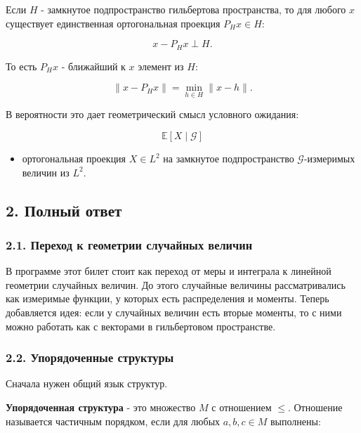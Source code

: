 \documentclass[
  11pt,
  a4paper,
]{article}
\providecommand{\tightlist}{%
  \setlength{\itemsep}{0pt}\setlength{\parskip}{0pt}}
\begin{document}
Если \(H\) - замкнутое подпространство гильбертова пространства, то для
любого \(x\) существует единственная ортогональная проекция
\(P_Hx\in H\):

\[
x-P_Hx\perp H.
\]

То есть \(P_Hx\) - ближайший к \(x\) элемент из \(H\):

\[
\|x-P_Hx\|=\min_{h\in H}\|x-h\|.
\]

В вероятности это дает геометрический смысл условного ожидания:

\[
\mathbb E[X\mid\mathcal G]
\]

\begin{itemize}
\tightlist
\item
  ортогональная проекция \(X\in L^2\) на замкнутое подпространство
  \(\mathcal G\)-измеримых величин из \(L^2\).
\end{itemize}

\subsection{2. Полный
ответ}\label{ux43fux43eux43bux43dux44bux439-ux43eux442ux432ux435ux442}

\subsubsection{2.1. Переход к геометрии случайных
величин}\label{ux43fux435ux440ux435ux445ux43eux434-ux43a-ux433ux435ux43eux43cux435ux442ux440ux438ux438-ux441ux43bux443ux447ux430ux439ux43dux44bux445-ux432ux435ux43bux438ux447ux438ux43d}

В программе этот билет стоит как переход от меры и интеграла к линейной
геометрии случайных величин. До этого случайные величины рассматривались
как измеримые функции, у которых есть распределения и моменты. Теперь
добавляется идея: если у случайных величин есть вторые моменты, то с
ними можно работать как с векторами в гильбертовом пространстве.

\subsubsection{2.2. Упорядоченные
структуры}\label{ux443ux43fux43eux440ux44fux434ux43eux447ux435ux43dux43dux44bux435-ux441ux442ux440ux443ux43aux442ux443ux440ux44b}

Сначала нужен общий язык структур.

\textbf{Упорядоченная структура} - это множество \(M\) с отношением
\(\le\). Отношение называется частичным порядком, если для любых
\(a,b,c\in M\) выполнены:
\end{document}
